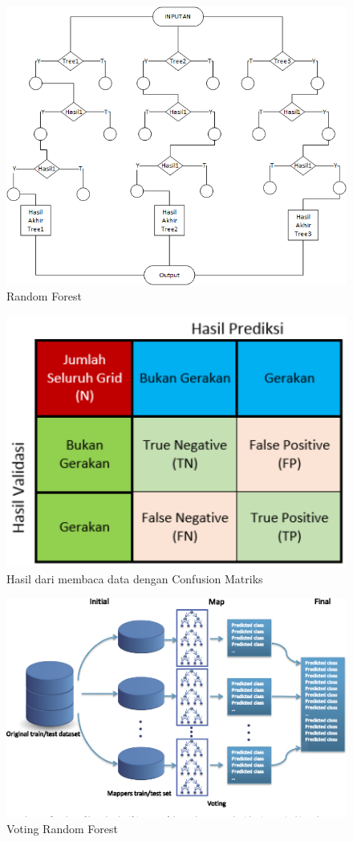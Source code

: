 \begin{figure}[ht]
	\centerline{\includegraphics[width=1\textwidth]{figures/fathi/chapter3/1.png}}
	\caption{Random Forest}
	\label{fig1}
\end{figure}

\begin{figure}[ht]
	\centerline{\includegraphics[width=1\textwidth]{figures/fathi/chapter3/2.PNG}}
	\caption{Hasil dari membaca data dengan Confusion Matriks}
	\label{fig2}
\end{figure}

\begin{figure}[ht]
	\centerline{\includegraphics[width=1\textwidth]{figures/fathi/chapter3/3.png}}
	\caption{Voting Random Forest}
	\label{fig3}
\end{figure}